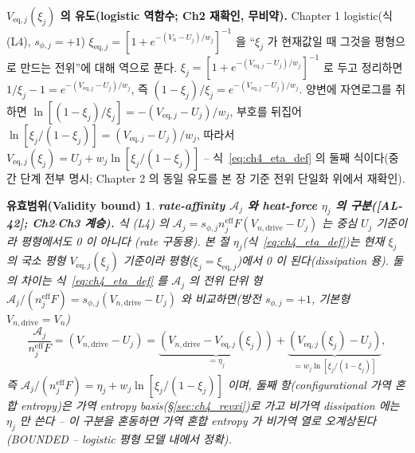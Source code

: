 \documentclass[11pt,a4paper]{article}
\newtheorem*{boundbox}{유효범위(Validity bound)}
\newcommand{\eff}{\mathrm{eff}}
\newcommand{\eq}{\mathrm{eq}}
\newcommand{\drive}{\mathrm{drive}}
\newcommand{\AL}[1]{\textsf{[AL-#1]}}
\begin{document}
\textbf{$V_{\eq,j}(\xi_j)$ 의 유도(logistic 역함수; Ch2 재확인, 무비약).} Chapter 1 logistic(식 (L4),
$s_{\phi,j}=+1$) $\xi_{\eq,j}=[1+e^{-(V_n-U_j)/w_j}]^{-1}$ 을 ``$\xi_j$ 가 현재값일 때 그것을 평형으로 만드는
전위''에 대해 역으로 푼다. $\xi_j=[1+e^{-(V_{\eq,j}-U_j)/w_j}]^{-1}$ 로 두고 정리하면 $1/\xi_j-1=
e^{-(V_{\eq,j}-U_j)/w_j}$, 즉 $(1-\xi_j)/\xi_j=e^{-(V_{\eq,j}-U_j)/w_j}$. 양변에 자연로그를 취하면
$\ln[(1-\xi_j)/\xi_j]=-(V_{\eq,j}-U_j)/w_j$, 부호를 뒤집어 $\ln[\xi_j/(1-\xi_j)]=(V_{\eq,j}-U_j)/w_j$, 따라서
$V_{\eq,j}(\xi_j)=U_j+w_j\ln[\xi_j/(1-\xi_j)]$ -- 식~\eqref{eq:ch4_eta_def} 의 둘째 식이다(중간 단계 전부 명시;
Chapter 2 의 동일 유도를 본 장 기준 전위 단일화 위에서 재확인).
\begin{boundbox}
\textbf{rate-affinity $\mathcal A_j$ 와 heat-force $\eta_j$ 의 구분(\AL{42}; Ch2$\cdot$Ch3 계승).} 식 (L4) 의
$\mathcal A_j=s_{\phi,j}n_j^{\eff}F(V_{n,\drive}-U_j)$ 는 \emph{중심} $U_j$ 기준이라 평형에서도 0 이 아니다
(rate 구동용). 본 절 $\eta_j$(식~\eqref{eq:ch4_eta_def})는 \emph{현재} $\xi_j$ 의 국소 평형 $V_{\eq,j}(\xi_j)$
기준이라 평형($\xi_j=\xi_{\eq,j}$)에서 0 이 된다(dissipation 용). 둘의 차이는 식~\eqref{eq:ch4_eta_def} 를
$\mathcal A_j$ 의 전위 단위 형 $\mathcal A_j/(n_j^{\eff}F)=s_{\phi,j}(V_{n,\drive}-U_j)$ 와 비교하면(방전
$s_{\phi,j}=+1$, 기본형 $V_{n,\drive}=V_n$)
\[
\frac{\mathcal A_j}{n_j^{\eff}F}=(V_{n,\drive}-U_j)
=\underbrace{(V_{n,\drive}-V_{\eq,j}(\xi_j))}_{=\eta_j}
+\underbrace{(V_{\eq,j}(\xi_j)-U_j)}_{=w_j\ln[\xi_j/(1-\xi_j)]},
\]
즉 $\mathcal A_j/(n_j^{\eff}F)=\eta_j+w_j\ln[\xi_j/(1-\xi_j)]$ 이며, 둘째 항(configurational 가역 혼합 entropy)은
\emph{가역} entropy basis(\S\ref{sec:ch4_revxi})로 가고 \emph{비가역} dissipation 에는 $\eta_j$ 만 쓴다 -- 이
구분을 혼동하면 가역 혼합 entropy 가 비가역 열로 오계상된다(BOUNDED -- logistic 평형 모델 내에서 정확).
\end{boundbox}

\end{document}
